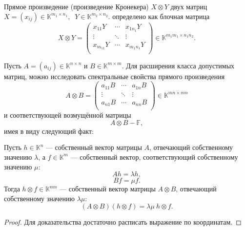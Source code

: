 Прямое произведение (произведение Кронекера)
    \( X\otimes Y \)
    двух матриц
    \( X{=}(x_{ij}){\in}\mathbb{K}^{m_1{\times}n_1},\ \)
    \( Y{\in}\mathbb{K}^{m_2{\times}n_2} \).
    определено как блочная матрица
\[
    X\otimes Y =
    \begin{pmatrix}
        x_{11} Y & \cdots & x_{1n_1} Y \\
        \vdots   & \ddots & \vdots \\
        x_{m_11} Y & \cdots & x_{m_1n_1} Y \\
    \end{pmatrix}\in\mathbb{K}^{m_1m_1\times n_1n_2}.
    \]

Пусть \( A{=}(a_{ij}){\in}\mathbb{K}^{n\times n} \)
    и \( B\in\mathbb{K}^{m\times m} \).
Для расширения класса допустимых матриц,
    можно исследовать спектральные свойства прямого произведения
    \[
        A\otimes B = 
        \begin{pmatrix}
            a_{11} B & \cdots & a_{1n} B \\
            \vdots   & \ddots & \vdots \\
            a_{n1} B & \cdots & a_{nn} B \\
        \end{pmatrix}\in\mathbb{K}^{mn\times mn}
        \]
    и соответствующей возмущённой матрицы
    \begin{equation}\label{ksv:disturbkron}
        A\otimes B - \mathbb{F},
    \end{equation}
    имея в виду следующий факт:

\begin{ksvlem}
    Пусть \( h\in\mathbb{K}^n \) --- собственный вектор матрицы \( A \),
    отвечающий собственному значению \( \lambda \),
    а \( f\in\mathbb{K}^m \) --- собственный вектор,
    соответствующий собственному значению \( \mu \):
    \[
        A h = \lambda h,
        \]
    \[
        B f = \mu f.
        \]
    Тогда \( h\otimes f \in \mathbb{K}^{mn} \)
    --- собственный вектор матрицы \( A\otimes B \),
    отвечающий собственному значению \( \lambda\mu \):
    \[
        (A\otimes B)(h\otimes f) = \lambda\mu\ h\otimes f.
        \]
\end{ksvlem}
\begin{proof}
    Для доказательства достаточно расписать выражение по координатам.
\end{proof}

